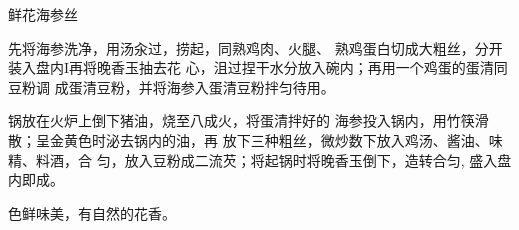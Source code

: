 \begin{recipe}{鲜花海参丝}

\ingredients



\cooking

\step 先将海参洗净，用汤汆过，捞起，同熟鸡肉、火腿、 熟鸡蛋白切成大粗丝，分开装入盘内I再将晚香玉抽去花 心，沮过捏干水分放入碗内；再用一个鸡蛋的蛋清同豆粉调 成蛋清豆粉，并将海参入蛋清豆粉拌匀待用。

\step 锅放在火炉上倒下猪油，烧至八成火，将蛋清拌好的 海参投入锅内，用竹筷滑散；呈金黄色时泌去锅内的油，再 放下三种粗丝，微炒数下放入鸡汤、酱油、味精、料酒，合 匀，放入豆粉成二流芡；将起锅时将晚香玉倒下，造转合匀, 盛入盘内即成。

\notes

色鲜味美，有自然的花香。

\end{recipe}

